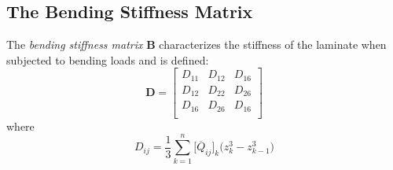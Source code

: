 \documentclass{article}
\begin{document}
  \subsection{The Bending Stiffness Matrix}
  The \emph{bending stiffness matrix} $\bm{B}$ characterizes the stiffness of the laminate when subjected to bending loads and is defined:
  \begin{equation}
    \bm{D} = \left[ \begin{array}{ccc}
               D_{11} & D_{12} & D_{16} \\
               D_{12} & D_{22} & D_{26} \\
               D_{16} & D_{26} & D_{16} \\
             \end{array} \right]
  \end{equation}
  where
  \begin{equation}
    D_{ij} = \frac{1}{3}\sum_{k=1}^{n}\big[\overline{Q}_{ij}\big]_{k}\big(z_{k}^{3} - z_{k-1}^{3}\big)
  \end{equation}
\end{document}
